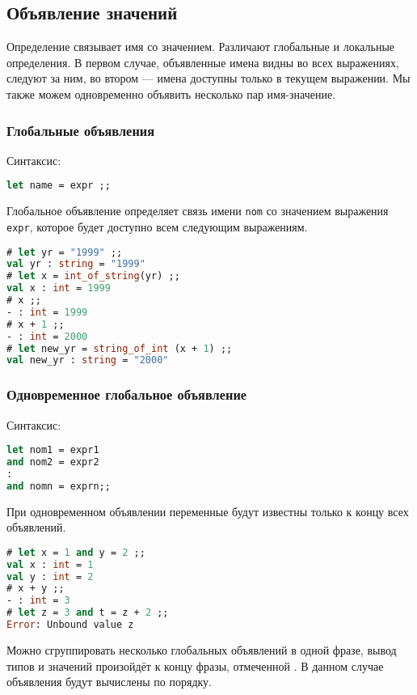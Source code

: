 \subsection{Объявление значений}

Определение связывает имя со значением. Различают глобальные и локальные
определения. В первом случае, объявленные имена видны во всех выражениях,
следуют за ним, во втором --- имена доступны только в текущем выражении. Мы
также можем одновременно объявить несколько пар имя-значение.

\subsubsection{Глобальные объявления}

Синтаксис:

\begin{lstlisting}[language=OCaml]
let name = expr ;;
\end{lstlisting}

Глобальное объявление определяет связь имени \texttt{nom} со значением выражения
\texttt{expr}, которое будет доступно всем следующим выражениям.

\begin{lstlisting}[language=OCaml]
# let yr = "1999" ;;
val yr : string = "1999"
# let x = int_of_string(yr) ;;
val x : int = 1999
# x ;;
- : int = 1999
# x + 1 ;;
- : int = 2000
# let new_yr = string_of_int (x + 1) ;;
val new_yr : string = "2000"
\end{lstlisting}

\subsubsection{Одновременное глобальное объявление}

Синтаксис:

\begin{lstlisting}[language=OCaml]
let nom1 = expr1
and nom2 = expr2
:
and nomn = exprn;;
\end{lstlisting}

При одновременном объявлении переменные будут известны только к концу всех
объявлений.

\begin{lstlisting}[language=OCaml]
# let x = 1 and y = 2 ;;
val x : int = 1
val y : int = 2
# x + y ;;
- : int = 3
# let z = 3 and t = z + 2 ;;
Error: Unbound value z
\end{lstlisting}

Можно сгруппировать несколько глобальных объявлений в одной фразе, вывод типов и
значений произойдёт к концу фразы, отмеченной \enq{;;}. В данном случае
объявления будут вычислены по порядку.

